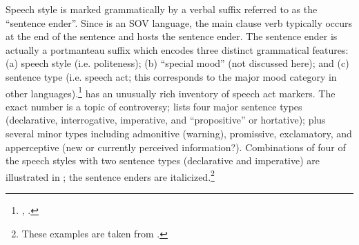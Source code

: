 Speech style is marked grammatically by a verbal suffix referred to as the “sentence ender”. Since  is an SOV language, the main clause verb typically occurs at the end of the sentence and hosts the sentence ender. The sentence ender is actually a portmanteau suffix which encodes three distinct grammatical features: (a) speech style (i.e. politeness); (b) “special mood” (not discussed here); and (c) sentence type (i.e. speech act; this corresponds to the major mood category in other languages).\footnote{\citet{Sohn1999}, \citet{Pak2008}.}  has an unusually rich inventory of speech act markers. The exact number is a topic of controversy; \citet{Sohn1999} lists four major sentence types (declarative, interrogative, imperative, and “propositive” or hortative); plus several minor types including admonitive (warning), promissive, exclamatory, and apperceptive (new or currently perceived information?). Combinations of four of the speech styles with two sentence types (declarative and imperative) are illustrated in ; the sentence enders are italicized.\footnote{These examples are taken from \citet{PakEtAl2013}.}
 

